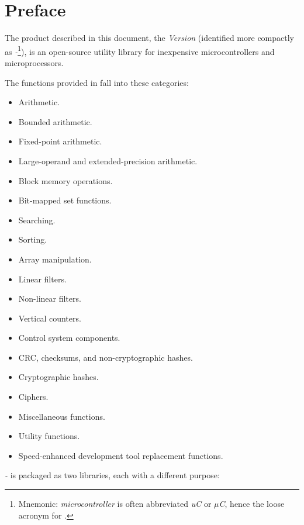 \chapter{Preface}

The product described in this document, the 
\emph{\productbasenamelong{} Version \productversion{}}
(identified more compactly as 
\emph{\productbasenameshort{}-\productversion{}}\footnote{Mnemonic:
\emph{microcontroller} is often abbreviated \emph{uC} or $\mu$\emph{C}, hence the
loose acronym \emph{\productbasenameshort{}} for \emph{\productbasenamelong{}}.}),
is an open-source utility library for inexpensive microcontrollers
and microprocessors.

The functions provided in \emph{\productbasenameshort{}} fall into these categories:

\begin{itemize}
\item Arithmetic.
\item Bounded arithmetic.
\item Fixed-point arithmetic.
\item Large-operand and extended-precision arithmetic.
\item Block memory operations.
\item Bit-mapped set functions.
\item Searching.
\item Sorting.
\item Array manipulation.
\item Linear filters.
\item Non-linear filters.
\item Vertical counters.
\item Control system components.
\item CRC, checksums, and non-cryptographic hashes.
\item Cryptographic hashes.
\item Ciphers.
\item Miscellaneous functions.
\item Utility functions.
\item Speed-enhanced development tool replacement functions.
\end{itemize}

\emph{\productbasenameshort{}-\productversion{}}
is packaged as two libraries, each with
a different purpose:

